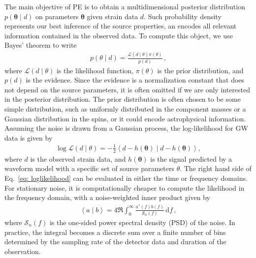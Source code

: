 \documentclass[twocolumn]{aastex631}
\begin{document}
The main objective of PE is to obtain a multidimensional posterior distribution
$p(\mathbf{\theta} \mid d)$ on parameters $\mathbf{\theta}$ given strain
data $d$.  Such probability density represents our best inference of
the source properties, an encodes all relevant information contained in the
observed data.
To compute this object, we use Bayes' theorem to write
\begin{align} \label{eq: bayes}
    p(\theta \mid d) = \frac{\mathcal{L}(d \mid \theta)\pi(\theta)}{p(d)}\, ,
\end{align}
where $\mathcal{L}(d \mid \theta)$ is the likelihood function, $\pi(\theta)$ is
the prior distribution, and $p(d)$ is the evidence. Since the evidence is a
normalization constant that does not depend on the source parameters, it is
often omitted if we are only interested in the posterior distribution. The prior
distribution is often chosen to be some simple distribution, such as uniformly
distributed in the component masses or a Gaussian distribution in the spins, or
it could encode astrophysical information. Assuming the noise is drawn from a
Gaussian process, the log-likelihood for GW data is given by
\begin{align}
    \log{\mathcal{L}(d \mid \theta)} = -\frac{1}{2} \left\langle d-h(\mathbf{\theta}) \mid d-h(\mathbf{\theta})\right\rangle,
\label{eq: loglikelihood}
\end{align}
where $d$ is the observed strain data, and $h(\mathbf{\theta})$ is the signal
predicted by a waveform model with a specific set of source parameters
$\theta$.  The right hand side of Eq.~\eqref{eq: loglikelihood} can be
evaluated in either the time or frequency domains. For stationary noise, it is
computationally cheaper to compute the likelihood in the frequency domain, with
a noise-weighted inner product given by
\begin{align}
    \left\langle a \mid b\right\rangle = 4 \Re \int_0^\infty \frac{a^*(f)b(f)}{\mathcal{S}_n(f)}\, \mathrm{d}f \, ,
\label{eq: innerproduct}
\end{align}
where $\mathcal{S}_n(f)$ is the one-sided power spectral density (PSD) of the
noise.  In practice, the integral becomes a discrete sum over a finite number
of bins determined by the sampling rate of the detector data and duration of
the observation.
\end{document}
